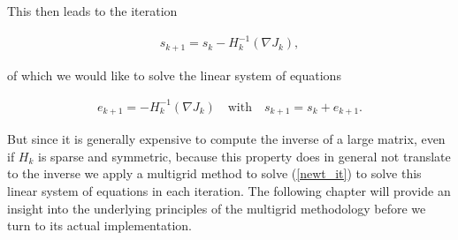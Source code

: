 \documentclass[../draft_1.tex]{subfiles}
\begin{document}
This then leads to the iteration
\begin{ceqn}
	\begin{align}	
	s_{k+1} = s_k - H_k^{-1}(\nabla J_k),
	\end{align}
\end{ceqn}
of which we would like to solve the linear system of equations 
\begin{ceqn}
	\begin{align}	
	\label{newt_it}
	e_{k+1} = - H_k^{-1}(\nabla J_k) \quad \text{with} \quad
	s_{k+1} =  s_k + e_{k+1}.
	\end{align}
\end{ceqn}
But since it is generally expensive to compute the inverse of a large matrix, even if $H_k$ is sparse and symmetric, because this property does in general not translate to the inverse we apply a multigrid method to solve (\ref{newt_it}) to solve this linear system of equations in each iteration. The following chapter will provide an insight into the underlying principles of the multigrid methodology before we turn to its actual implementation.
\end{document}
